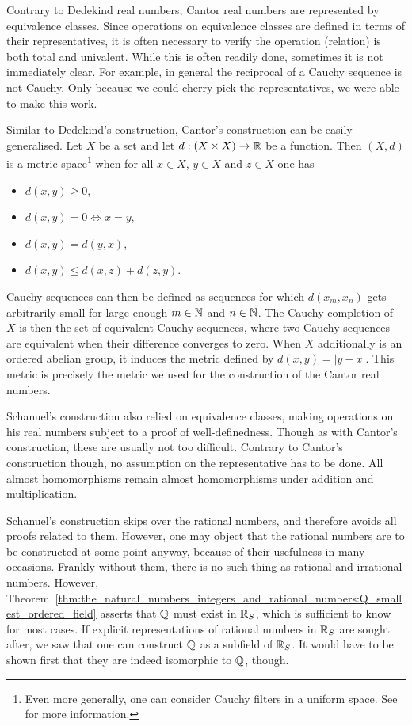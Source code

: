 \documentclass[../main.tex]{subfiles}
\begin{document}
Contrary to Dedekind real numbers, Cantor real numbers are represented by equivalence classes. Since operations on equivalence classes are defined in terms of their representatives, it is often necessary to verify the operation (relation) is both total and univalent. While this is often readily done, sometimes it is not immediately clear. For example, in general the reciprocal of a Cauchy sequence is not Cauchy. Only because we could cherry-pick the representatives, we were able to make this work.

Similar to Dedekind's construction, Cantor's construction can be easily generalised. Let $X$ be a set and let $d:(X\times X)\to\mathbb{R}$ be a function. Then $(X,d)$ is a metric space\footnote{Even more generally, one can consider Cauchy filters in a uniform space. See \cite{Kelley1975} for more information.} when for all $x\in X$, $y\in X$ and $z\in X$ one has
\begin{itemize}
    \item $d(x,y)\geq0$,
    \item $d(x,y)=0\iff x=y$,
    \item $d(x,y)=d(y,x)$,
    \item $d(x,y)\leq d(x,z)+d(z,y)$.
\end{itemize}
Cauchy sequences can then be defined as sequences for which $d(x_m,x_n)$ gets arbitrarily small for large enough $m\in\mathbb{N}$ and $n\in\mathbb{N}$. The Cauchy-completion of $X$ is then the set of equivalent Cauchy sequences, where two Cauchy sequences are equivalent when their difference converges to zero. When $X$ additionally is an ordered abelian group, it induces the metric defined by $d(x,y)=\vert y-x\vert$. This metric is precisely the metric we used for the construction of the Cantor real numbers.

Schanuel's construction also relied on equivalence classes, making operations on his real numbers subject to a proof of well-definedness. Though as with Cantor's construction, these are usually not too difficult. Contrary to Cantor's construction though, no assumption on the representative has to be done. All almost homomorphisms remain almost homomorphisms under addition and multiplication.

Schanuel's construction skips over the rational numbers, and therefore avoids all proofs related to them. However, one may object that the rational numbers are to be constructed at some point anyway, because of their usefulness in many occasions. Frankly without them, there is no such thing as rational and irrational numbers. However, Theorem~\ref{thm:the_natural_numbers_integers_and_rational_numbers:Q_smallest_ordered_field} asserts that $\mathbb{Q}$ must exist in $\mathbb{R}_S$, which is sufficient to know for most cases. If explicit representations of rational numbers in $\mathbb{R}_S$ are sought after, we saw that one can construct $\mathbb{Q}$ as a subfield of $\mathbb{R}_S$. It would have to be shown first that they are indeed isomorphic to $\mathbb{Q}$, though.
\end{document}
